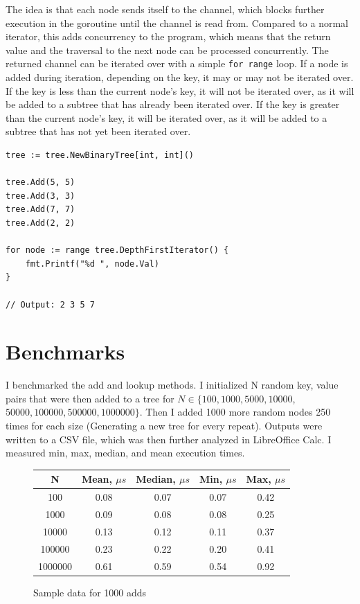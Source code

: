 \documentclass[a4paper,11pt]{article}
\begin{document}
    The idea is that each node sends itself to the channel, which blocks further execution in the goroutine until the channel is read from. Compared to a normal iterator, this adds concurrency to the program, which means that the return value and the traversal to the next node can be processed concurrently. The returned channel can be iterated over with a simple \texttt{for range} loop. If a node is added during iteration, depending on the key, it may or may not be iterated over. If the key is less than the current node's key, it will not be iterated over, as it will be added to a subtree that has already been iterated over. If the key is greater than the current node's key, it will be iterated over, as it will be added to a subtree that has not yet been iterated over.

    \begin{verbatim}
tree := tree.NewBinaryTree[int, int]()

tree.Add(5, 5)
tree.Add(3, 3)
tree.Add(7, 7)
tree.Add(2, 2)

for node := range tree.DepthFirstIterator() {
    fmt.Printf("%d ", node.Val)
}

// Output: 2 3 5 7
    \end{verbatim}

    \section*{Benchmarks}

    I benchmarked the add and lookup methods. I initialized N random key, value pairs that were then added to a tree for $N \in \{100, 1000, 5000, 10000$, $50000, 100000, 500000, 1000000\}$. Then I added 1000 more random nodes 250 times for each size (Generating a new tree for every repeat). Outputs were written to a CSV file, which was then further analyzed in LibreOffice Calc. I measured min, max, median, and mean execution times.

    \begin{figure}[H]
        \centering
        \begin{tabular}{c|c|c|c|c}
            N & Mean, $\mu s$ & Median, $\mu s$ & Min, $\mu s$ & Max, $\mu s$ \\
            \hline
            \hline
            100 & 0.08 & 0.07 & 0.07 & 0.42 \\
            \hline
            1000 & 0.09 & 0.08 & 0.08 & 0.25 \\
            \hline
            10000 & 0.13 & 0.12 & 0.11 & 0.37 \\
            \hline
            100000 & 0.23 & 0.22 & 0.20 & 0.41 \\
            \hline
            1000000 & 0.61 & 0.59 & 0.54 & 0.92 \\
        \end{tabular}

        \caption{Sample data for 1000 adds}
    \end{figure}
\end{document}

